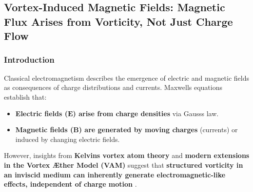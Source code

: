 

\subsection{Vortex-Induced Magnetic Fields: Magnetic Flux Arises from Vorticity, Not Just Charge Flow}\label{subsec:vortex-induced-magnetic-fields:-magnetic-flux-arises-from-vorticity-not-just-charge-flow}

\begin{abstract}
    This study presents a rigorous reformulation of \textbf{electromagnetic field generation}  in the \textbf{Vortex Æther Model (VAM)} , wherein magnetic flux arises not solely from moving electric charges but also from \textbf{structured vorticity fields}  in an inviscid, incompressible medium. While classical electrodynamics attributes magnetic fields to current flow and time-dependent electric fields, VAM proposes that \textbf{magnetic fields are a direct consequence of vorticity conservation and rotational dynamics} . By extending \textbf{Kelvin\rqs s vortex dynamics} , \textbf{Helmholtz\rqs s vorticity conservation laws} , and \textbf{Maxwell\rqs s electrodynamics} , we derive modified \textbf{tensorial field equations}  integrating vorticity-driven magnetic induction. These formulations propose that \textbf{self-sustained magnetic flux structures can emerge within plasmonic systems, superfluid vortices, and astrophysical plasma configurations} , leading to potential experimental validations that challenge the classical charge-based paradigm of electromagnetism.
\end{abstract}

\subsubsection*{Introduction}
Classical electromagnetism describes the emergence of electric and magnetic fields as consequences of charge distributions and currents. Maxwell\rqs s equations establish that:
\begin{itemize}
    \item \textbf{Electric fields (\(\mathbf{E}\)) arise from charge densities}  via Gauss\rqs s law.
    \item \textbf{Magnetic fields (\(\mathbf{B}\)) are generated by moving charges}  (currents) or induced by changing electric fields.
\end{itemize}
However, insights from \textbf{Kelvin\rqs s vortex atom theory}  and \textbf{modern extensions in the Vortex Æther Model (VAM)}  suggest that \textbf{structured vorticity in an inviscid medium can inherently generate electromagnetic-like effects, independent of charge motion} .

